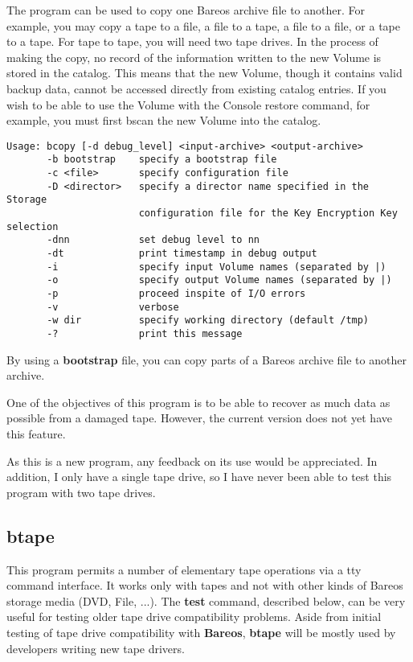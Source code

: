 The  program can be used to copy one Bareos archive file to
another. For example, you may copy a tape to a file, a file to a tape, a file
to a file, or a tape to a tape. For tape to tape, you will need two tape
drives. In the
process of making the copy, no record of the information written to the new
Volume is stored in the catalog. This means that the new Volume, though it
contains valid backup data, cannot be accessed directly from existing catalog
entries. If you wish to be able to use the Volume with the Console restore
command, for example, you must first bscan the new Volume into the catalog.

\footnotesize
\begin{verbatim}
Usage: bcopy [-d debug_level] <input-archive> <output-archive>
       -b bootstrap    specify a bootstrap file
       -c <file>       specify configuration file
       -D <director>   specify a director name specified in the Storage
                       configuration file for the Key Encryption Key selection
       -dnn            set debug level to nn
       -dt             print timestamp in debug output
       -i              specify input Volume names (separated by |)
       -o              specify output Volume names (separated by |)
       -p              proceed inspite of I/O errors
       -v              verbose
       -w dir          specify working directory (default /tmp)
       -?              print this message
\end{verbatim}
\normalsize

By using a {\bf bootstrap} file, you can copy parts of a Bareos archive file
to another archive.

One of the objectives of this program is to be able to recover as much data as
possible from a damaged tape. However, the current version does not yet have
this feature.

As this is a new program, any feedback on its use would be appreciated. In
addition, I only have a single tape drive, so I have never been able to test
this program with two tape drives.

\subsection{btape}
\label{btape}

This program permits a number of elementary tape operations via a tty command
interface. It works only with tapes and not with other kinds of Bareos
storage media (DVD, File, ...).
The {\bf test} command, described below,
can be very useful for testing older tape drive compatibility problems.
Aside from initial testing of tape drive compatibility with {\bf Bareos},
{\bf btape} will be mostly used by developers writing new tape drivers.

